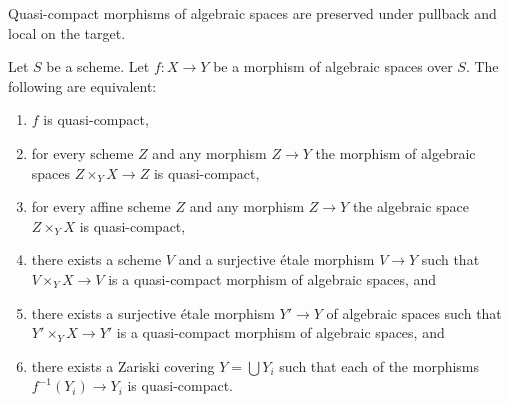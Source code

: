 \begin{lemma}
\label{lemma-quasi-compact-local}
\begin{slogan}
Quasi-compact morphisms of algebraic spaces are preserved under pullback
and local on the target.
\end{slogan}
Let $S$ be a scheme.
Let $f : X \to Y$ be a morphism of algebraic spaces over $S$.
The following are equivalent:
\begin{enumerate}
\item $f$ is quasi-compact,
\item for every scheme $Z$ and any morphism $Z \to Y$ the morphism of
algebraic spaces $Z \times_Y X \to Z$ is quasi-compact,
\item for every affine scheme $Z$ and any morphism
$Z \to Y$ the algebraic space $Z \times_Y X$ is quasi-compact,
\item there exists a scheme $V$ and a surjective \'etale morphism
$V \to Y$ such that $V \times_Y X \to V$ is a quasi-compact morphism
of algebraic spaces, and
\item there exists a surjective \'etale morphism
$Y' \to Y$ of algebraic spaces such that $Y' \times_Y X \to Y'$
is a quasi-compact morphism of algebraic spaces, and
\item there exists a Zariski covering $Y = \bigcup Y_i$ such that
each of the morphisms $f^{-1}(Y_i) \to Y_i$ is quasi-compact.
\end{enumerate}
\end{lemma}

